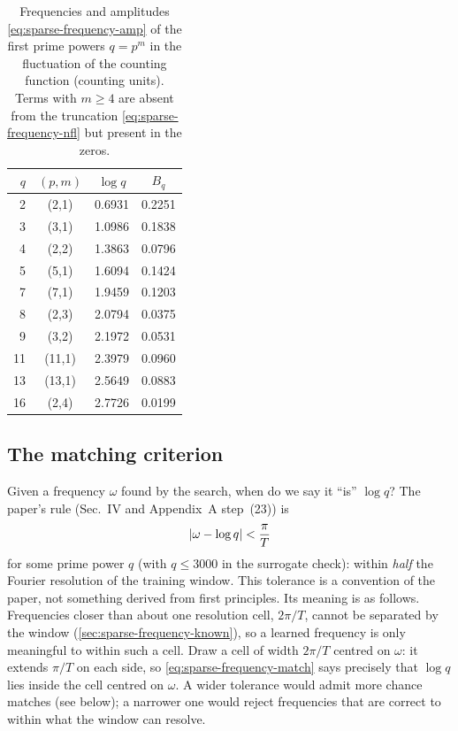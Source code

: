 \begin{table}[htbp]\centering
\caption{Frequencies and amplitudes \eqref{eq:sparse-frequency-amp} of the first prime powers $q=p^m$ in the fluctuation of the counting function (counting units). Terms with $m\ge4$ are absent from the truncation \eqref{eq:sparse-frequency-nfl} but present in the zeros.}
\label{tab:sparse-frequency-amps}
\begin{tabular}{rccc}
\toprule
$q$ & $(p,m)$ & $\log q$ & $B_q$\\
\midrule
2 & (2,1) & 0.6931 & 0.2251\\
3 & (3,1) & 1.0986 & 0.1838\\
4 & (2,2) & 1.3863 & 0.0796\\
5 & (5,1) & 1.6094 & 0.1424\\
7 & (7,1) & 1.9459 & 0.1203\\
8 & (2,3) & 2.0794 & 0.0375\\
9 & (3,2) & 2.1972 & 0.0531\\
11 & (11,1) & 2.3979 & 0.0960\\
13 & (13,1) & 2.5649 & 0.0883\\
16 & (2,4) & 2.7726 & 0.0199\\
\bottomrule
\end{tabular}
\end{table}

\subsection{The matching criterion}

Given a frequency $\omega$ found by the search, when do we say it ``is'' $\log q$? The paper's rule (Sec.~IV and Appendix~A step~(23)) is
\begin{equation}
\left\lvert \omega-\log q\right\rvert<\frac{\pi}{T}
\label{eq:sparse-frequency-match}
\end{equation}
for some prime power $q$ (with $q\le3000$ in the surrogate check): within \emph{half} the Fourier resolution of the training window. This tolerance is a convention of the paper, not something derived from first principles. Its meaning is as follows. Frequencies closer than about one resolution cell, $2\pi/T$, cannot be separated by the window (\cref{sec:sparse-frequency-known}), so a learned frequency is only meaningful to within such a cell. Draw a cell of width $2\pi/T$ centred on $\omega$: it extends $\pi/T$ on each side, so \eqref{eq:sparse-frequency-match} says precisely that $\log q$ lies inside the cell centred on $\omega$. A wider tolerance would admit more chance matches (see below); a narrower one would reject frequencies that are correct to within what the window can resolve.

